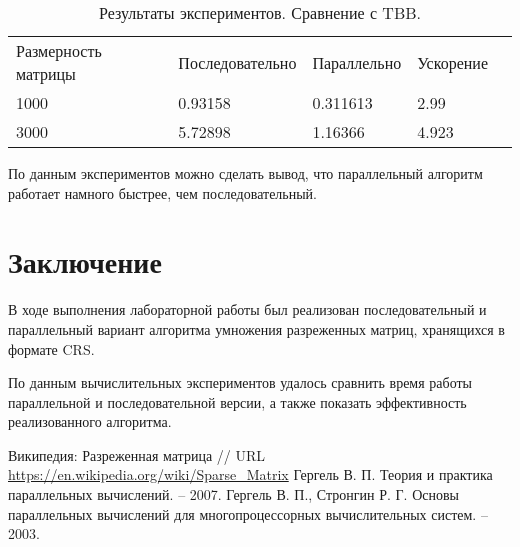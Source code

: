 \documentclass{report}
\begin{document}
\begin{table}[!h]
\caption{Результаты экспериментов. Сравнение с TBB.}
\centering
\begin{tabular}{lllll}
Размерность матрицы & Последовательно & Параллельно & Ускорение  \\
1000        & 0.93158         & 0.311613     & 2.99       \\
3000        & 5.72898         & 1.16366     & 4.923     
\end{tabular}
\end{table}

\par По данным экспериментов можно сделать вывод, что параллельный алгоритм работает намного быстрее, чем последовательный.
\newpage

\section*{Заключение}
В ходе выполнения лабораторной работы был реализован последовательный и параллельный вариант алгоритма умножения разреженных матриц, хранящихся в формате CRS.
\par По данным вычислительных экспериментов удалось сравнить время работы параллельной и последовательной версии, а также показать эффективность реализованного алгоритма.

\newpage

\begin{thebibliography}{1}
 Википедия: Разреженная матрица // URL \url {https://en.wikipedia.org/wiki/Sparse\_Matrix}
Гергель В. П. Теория и практика параллельных вычислений. – 2007. 
Гергель В. П., Стронгин Р. Г. Основы параллельных вычислений для многопроцессорных вычислительных систем. – 2003.

\end{thebibliography}
\newpage

\end{document}
